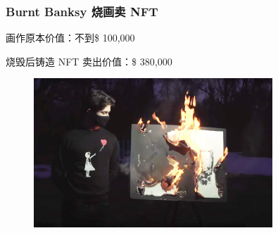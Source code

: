 \documentclass{beamer}
\begin{document}
\begin{frame}
    \frametitle{Burnt Banksy 烧画卖 NFT}

    画作原本价值：不到\$ 100,000

    烧毁后铸造 NFT 卖出价值：\$ 380,000

    \begin{figure}[htbp]
        \centering
        \includegraphics[width=0.8\textwidth]{burn.png}
    \end{figure}

\end{frame}
\end{document}
